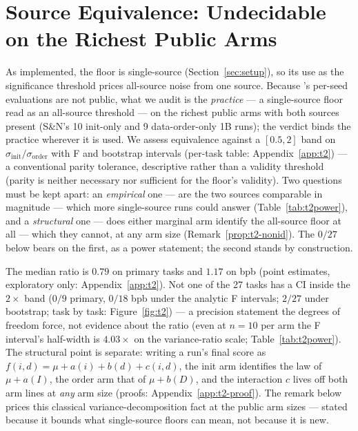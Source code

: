 
\section{Source Equivalence: Undecidable on the Richest Public Arms}
\label{sec:t2}

As implemented, the \citet{tencent2026} floor is single-source
(Section~\ref{sec:setup}), so its use as the significance threshold prices all-source noise from
one source. Because \citet{tencent2026}'s per-seed evaluations are not public, what we audit is
the \emph{practice} --- a single-source floor read as an all-source threshold --- on the richest
public arms with both sources present (S\&N's 10 init-only and 9 data-order-only 1B runs); the
verdict binds the practice wherever it is used. We assess equivalence against a
$[0.5, 2]$ band on $\sigma_{\mathrm{init}}/\sigma_{\mathrm{order}}$ with F and bootstrap
intervals (per-task table: Appendix~\ref{app:t2}) --- a conventional parity tolerance,
descriptive rather than a validity threshold (parity is neither necessary nor sufficient for
the floor's validity). Two questions must be kept
apart: an \emph{empirical} one --- are the two sources comparable in magnitude --- which more
single-source runs could answer (Table~\ref{tab:t2power}), and a \emph{structural} one ---
does either marginal arm identify the all-source floor at all --- which they cannot, at any
arm size (Remark~\ref{prop:t2-nonid}). The $0/27$ below bears on the first, as a power
statement; the second stands by construction.

The median ratio is $0.79$ on primary tasks and $1.17$ on bpb (point estimates, exploratory
only: Appendix~\ref{app:t2}). Not one of the 27 tasks has a CI inside the $2\times$ band
($0/9$ primary, $0/18$ bpb under the analytic F intervals; $2/27$ under bootstrap; task by task: Figure~\ref{fig:t2}) --- a
precision statement the degrees of freedom force, not evidence about the ratio (even at $n=10$
per arm the F interval's half-width is $4.03\times$ on the variance-ratio scale;
Table~\ref{tab:t2power}). The structural point is separate: writing a run's final score as
$f(i,d) = \mu + a(i) + b(d) + c(i,d)$, the init arm identifies the law of $\mu + a(I)$, the
order arm that of $\mu + b(D)$, and the interaction $c$ lives off both arm lines at \emph{any}
arm size (proofs: Appendix~\ref{app:t2-proof}). The remark below prices this classical
variance-decomposition fact \citep{searle1992variance} at the public arm sizes --- stated because it bounds what single-source floors can
mean, not because it is new.

